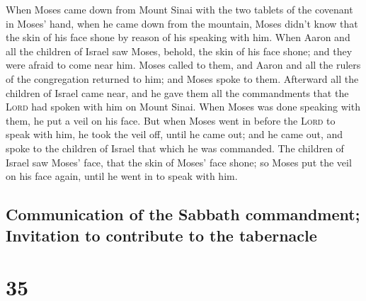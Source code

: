  When Moses came down from Mount Sinai with the two
tablets of the covenant in Moses' hand, when he came down from the
mountain, Moses didn't know that the skin of his face shone by reason of
his speaking with him.  When Aaron and all the children
of Israel saw Moses, behold, the skin of his face shone; and they were
afraid to come near him.  Moses called to them, and Aaron
and all the rulers of the congregation returned to him; and Moses spoke
to them.  Afterward all the children of Israel came near,
and he gave them all the commandments that the \textsc{Lord} had spoken
with him on Mount Sinai.  When Moses was done speaking
with them, he put a veil on his face.  But when Moses
went in before the \textsc{Lord} to speak with him, he took the veil
off, until he came out; and he came out, and spoke to the children of
Israel that which he was commanded.  The children of
Israel saw Moses' face, that the skin of Moses' face shone; so Moses put
the veil on his face again, until he went in to speak with him.

\hypertarget{communication-of-the-sabbath-commandment-invitation-to-contribute-to-the-tabernacle}{%
\subsection{Communication of the Sabbath commandment; Invitation to
contribute to the
tabernacle}\label{communication-of-the-sabbath-commandment-invitation-to-contribute-to-the-tabernacle}}

\hypertarget{section-34}{%
\section{35}\label{section-34}}

